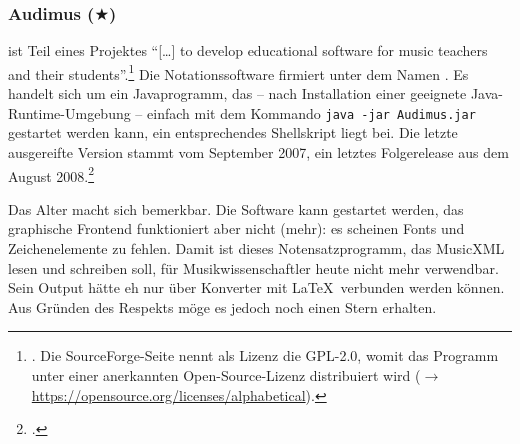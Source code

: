 %
%
%



\subsubsection{Audimus ($\bigstar$)}

\label{Audimus} ist Teil eines Projektes \enquote{[\ldots] to
develop educational software for music teachers and their
students}.\footnote{\cite[vgl.][\nopage wp]{Audimus2008a}. Die SourceForge-Seite
nennt als Lizenz die GPL-2.0, womit das Programm unter einer anerkannten
Open-Source-Lizenz distribuiert wird ($\rightarrow$
\href{https://opensource.org/licenses/alphabetical}
{https://opensource.org/licenses/alphabetical}).} Die Notationssoftware
firmiert unter dem Namen . Es handelt sich um ein
Javaprogramm, das -- nach Installation einer geeignete Java-Runtime-Umgebung --
einfach mit dem Kommando \texttt{java -jar Audimus.jar} gestartet werden kann,
ein entsprechendes Shellskript liegt bei. Die letzte ausgereifte Version stammt
vom September 2007, ein letztes Folgerelease aus dem August
2008.\footcite[vgl.][\nopage wp]{Audimus2008b}

Das Alter macht sich bemerkbar. Die Software kann gestartet werden, das
graphische Frontend funktioniert aber nicht (mehr): es scheinen Fonts und
Zeichenelemente zu fehlen. Damit ist dieses Notensatzprogramm, das MusicXML
lesen und schreiben soll, für Musikwissenschaftler heute nicht mehr verwendbar.
Sein Output hätte eh nur über Konverter mit \LaTeX\ verbunden werden können. Aus
Gründen des Respekts möge es jedoch noch einen Stern erhalten.



%
